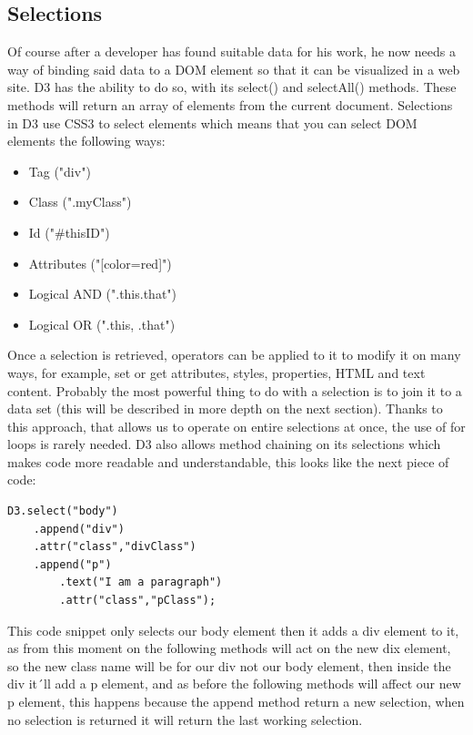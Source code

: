 \documentclass{bioinfo}
\begin{document}
\subsection{Selections}
Of course after a developer has found suitable data for his work, he now needs a way of binding said data to a DOM element so that it can be visualized in a web site. D3 has the ability to do so, with its select() and selectAll() methods. These methods will return an array of elements from the current document.
Selections in D3 use CSS3 to select elements which means that you can select DOM elements the following ways:
\begin{itemize}
\item Tag ("div")
\item Class (".myClass")
\item Id ("\#thisID")
\item Attributes ("[color=red]")
\item Logical AND (".this.that")
\item Logical OR (".this, .that")
\end{itemize}
Once a selection is retrieved, operators can be applied to it to modify it on many ways, for example, set or get attributes, styles, properties, HTML and text content. Probably the most powerful thing to do with a selection is to join it to a data set (this will be described in more depth on the next section).
Thanks to this approach, that allows us to operate on entire selections at once, the use of for loops is rarely needed. D3 also allows method chaining on its selections which makes code more readable and understandable, this looks like the next piece of code:
\begin{lstlisting}
D3.select("body")
	.append("div")
	.attr("class","divClass")
	.append("p")
		.text("I am a paragraph")
		.attr("class","pClass");
\end{lstlisting}
This code snippet only selects our body element then it adds a div element to it, as from this moment on the following methods will act on the new dix element, so the new class name will be for our div not our body element, then inside the div it´ll add a p element, and as before the following methods will affect our new p element, this happens because the append method return a new selection, when no selection is returned it will return the last working selection.
\end{document}
